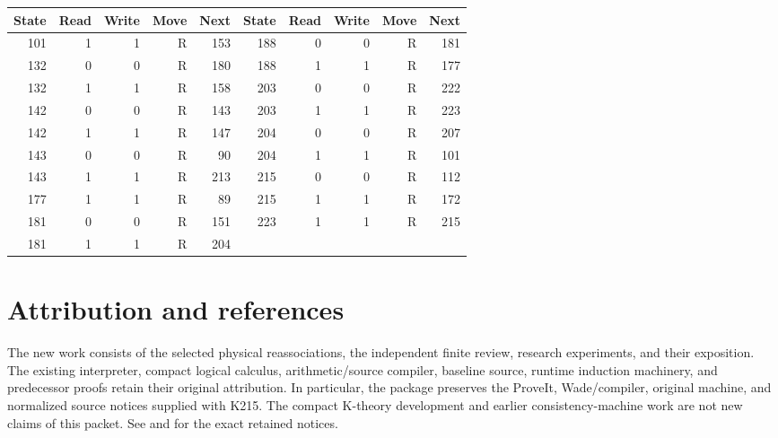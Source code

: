 \documentclass[11pt]{article}
\newcommand{\file}[1]{\texttt{\detokenize{#1}}}
\begin{document}
\begin{center}
\begin{tabular}{rrrrr@{\qquad\qquad}rrrrr}
\toprule
State & Read & Write & Move & Next & State & Read & Write & Move & Next\\
\midrule
101&1&1&R&153&188&0&0&R&181\\
132&0&0&R&180&188&1&1&R&177\\
132&1&1&R&158&203&0&0&R&222\\
142&0&0&R&143&203&1&1&R&223\\
142&1&1&R&147&204&0&0&R&207\\
143&0&0&R&90 &204&1&1&R&101\\
143&1&1&R&213&215&0&0&R&112\\
177&1&1&R&89 &215&1&1&R&172\\
181&0&0&R&151&223&1&1&R&215\\
181&1&1&R&204&&&&&\\
\bottomrule
\end{tabular}
\end{center}

\clearpage
\section{Attribution and references}

The new work consists of the selected physical reassociations, the
independent finite review, research experiments, and their exposition.
The existing interpreter, compact logical calculus, arithmetic/source
compiler, baseline source, runtime induction machinery, and predecessor
proofs retain their original attribution. In particular, the package
preserves the ProveIt, Wade/compiler, original machine, and normalized
source notices supplied with K215. The compact K-theory development
and earlier consistency-machine work are not new claims of this packet.
See \file{NOTICE.md} and \file{licenses/} for the exact retained notices.
\end{document}
